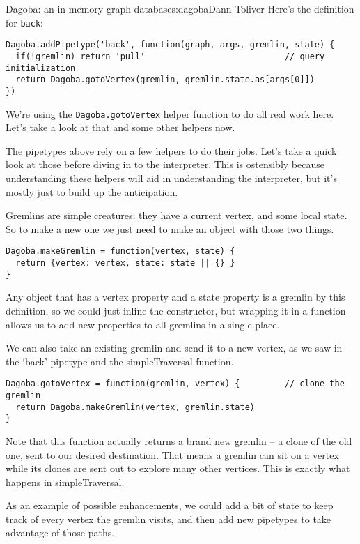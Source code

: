 \begin{aosachapter}{Dagoba: an in-memory graph database}{s:dagoba}{Dann Toliver}
Here's the definition for \texttt{back}:

\begin{verbatim}
Dagoba.addPipetype('back', function(graph, args, gremlin, state) {
  if(!gremlin) return 'pull'                            // query initialization
  return Dagoba.gotoVertex(gremlin, gremlin.state.as[args[0]])
})
\end{verbatim}

We're using the \texttt{Dagoba.gotoVertex} helper function to do all
real work here. Let's take a look at that and some other helpers now.

\label{helpers}

The pipetypes above rely on a few helpers to do their jobs. Let's take a
quick look at those before diving in to the interpreter. This is
ostensibly because understanding these helpers will aid in understanding
the interpreter, but it's mostly just to build up the anticipation.

\label{gremlins}

Gremlins are simple creatures: they have a current vertex, and some
local state. So to make a new one we just need to make an object with
those two things.

\begin{verbatim}
Dagoba.makeGremlin = function(vertex, state) {
  return {vertex: vertex, state: state || {} }
}
\end{verbatim}

Any object that has a vertex property and a state property is a gremlin
by this definition, so we could just inline the constructor, but
wrapping it in a function allows us to add new properties to all
gremlins in a single place.

We can also take an existing gremlin and send it to a new vertex, as we
saw in the `back' pipetype and the simpleTraversal function.

\begin{verbatim}
Dagoba.gotoVertex = function(gremlin, vertex) {         // clone the gremlin 
  return Dagoba.makeGremlin(vertex, gremlin.state)
}
\end{verbatim}

Note that this function actually returns a brand new gremlin -- a clone
of the old one, sent to our desired destination. That means a gremlin
can sit on a vertex while its clones are sent out to explore many other
vertices. This is exactly what happens in simpleTraversal.

As an example of possible enhancements, we could add a bit of state to
keep track of every vertex the gremlin visits, and then add new
pipetypes to take advantage of those paths.


\end{aosachapter}

